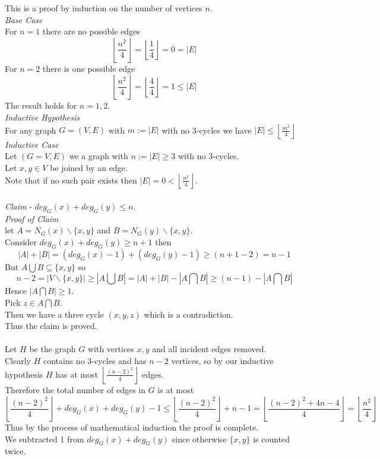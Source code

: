 \documentclass[11pt,a4paper]{article}
\begin{document}
This is a proof by induction on the number of vertices $n$.\\
\textit{Base Case}\\
For $n=1$ there are no possible edges
$$\left\lfloor\frac{n^2}{4}\right\rfloor=\left\lfloor\frac{1}{4}\right\rfloor=0=|E|$$
For $n=2$ there is one possible edge
$$\left\lfloor\frac{n^2}{4}\right\rfloor=\left\lfloor\frac{4}{4}\right\rfloor=1\leq|E|$$
The result holds for $n=1,2$.\\
\textit{Inductive Hypothesis}\\
For any graph $G=(V,E)$ with $m:=|E|$ with no 3-cycles we have $|E|\leq\left\lfloor\frac{m^2}{4}\right\rfloor$
\textit{Inductive Case}\\
Let $(G=V,E)$ we a graph with $n:=|E|\geq3$ with no 3-cycles.\\
Let $x,y\in V$ be joined by an edge.\\
Note that if no such pair exists then $|E|=0<\left\lfloor\frac{n^2}{4}\right\rfloor$.\\
\\
\textit{Claim} - $deg_G(x)+deg_G(y)\leq n$.\\
\textit{Proof of Claim}\\
let $A=N_G(x)\backslash\{x,y\}$ and $B=N_G(y)\backslash\{x,y\}$.\\
Consider $deg_G(x)+deg_G(y)\geq n+1$ then
$$|A|+|B|=(deg_G(x)-1)+(deg_G(y)-1)\geq(n+1-2)=n-1$$
But $A\bigcup B\subseteq\{x,y\}$ so
$$n-2=|V\backslash\{x,y\}|\geq|A\bigcup B|=|A|+|B|-|A\bigcap B|\geq(n-1)-|A\bigcap B|$$
Hence $|A\bigcap B|\geq 1$.\\
Pick $z\in A\bigcap B$.\\
Then we have a three cycle $(x,y,z)$ which is a contradiction.\\
Thus the claim is proved.\\
\\
Let $H$ be the graph $G$ with vertices $x,y$ and all incident edges removed.\\
Clearly $H$ contains no $3$-cycles and has $n-2$ vertices, so by our inductive hypothesis $H$ has at most $\left\lfloor\frac{(n-2)^2}{4}\right\rfloor$ edges.\\
Therefore the total number of edges in $G$ is at most
$$\left\lfloor\frac{(n-2)^2}{4}\right\rfloor+deg_G(x)+deg_G(y)-1\leq\left\lfloor\frac{(n-2)^2}{4}\right\rfloor+n-1=\left\lfloor\frac{(n-2)^2+4n-4}{4}\right\rfloor=\left\lfloor\frac{n^2}{4}\right\rfloor$$
Thus by the process of mathematical induction the proof is complete.\\
\nb We subtracted 1 from $deg_G(x)+deg_G(y)$ since otherwise $\{x,y\}$ is counted twice.\\
\end{document}
